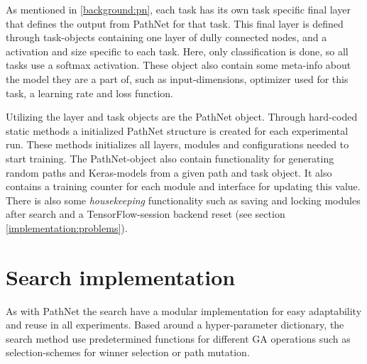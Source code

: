 As mentioned in \ref{background:pn}, each task has its own task specific final layer that defines the output from PathNet for that task. This final layer is defined through task-objects containing one layer of dully connected nodes, and a activation and size specific to each task. Here, only classification is done, so all tasks use a softmax activation. These object also contain some meta-info about the model they are a part of, such as input-dimensions, optimizer used for this task, a learning rate and loss function. 

Utilizing the layer and task objects are the PathNet object. Through hard-coded static methods a initialized PathNet structure is created for each experimental run. These methods initializes all layers, modules and configurations needed to start training. The PathNet-object also contain functionality for generating random paths and Keras-models from a given path and task object. It also contains a training counter for each module and interface for updating this value. There is also some \textit{housekeeping} functionality such as saving and locking modules after search and a TensorFlow-session backend reset (see section \ref{implementation:problems}).

\section{Search implementation}
As with PathNet the search have a modular implementation for easy adaptability and reuse in all experiments. Based around a hyper-parameter dictionary, the search method use predetermined functions for different GA operations such as selection-schemes for winner selection or path mutation. 

